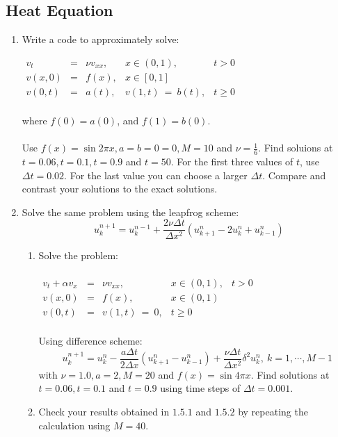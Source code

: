 \documentclass[12pt]{article}
\theoremstyle{definition}
\begin{document}
\subsection*{Heat Equation}
\noindent

\begin{enumerate}
\item Write a code to approximately solve:
\begin{center}$\begin{array}{ccccccc}
v_t&=&\nu v_{xx}, & x\in(0,1), & t>0\\
v(x,0)&=&f(x), & x\in[0,1]\\
v(0,t)&=&a(t), &v(1,t)\ =\ b(t), &t\geq0\\
\end{array}$\end{center}
where $f(0)=a(0)$, and $f(1)=b(0)$. \\ \\Use $f(x)=\sin{2\pi x}, a = b = 0=0, M =10$ and $\nu=\frac{1}{6}$. Find soluions at $t=0.06, t=0.1, t=0.9$ and $t=50$. For the first three values of $t$, use $\Delta t =0.02$. For the last value you can choose a larger $\Delta t$. Compare and contrast your solutions to the exact solutions.

\item Solve the same problem using the leapfrog scheme:\\
\[u_k^{n+1} = u_k^{n-1}+\frac{2\nu\Delta t}{\Delta x^2}(u_{k+1}^n - 2u_k^n+u_{k-1}^n)\]

\begin{enumerate}
\item Solve the problem:
\begin{center}$\begin{array}{cccccc}\\
v_t+\alpha v_x&=&\nu v_{xx}, & x\in(0,1), & t>0\\
v(x,0)&=&f(x), &x\in(0,1)\\
v(0,t)&=&v(1,t) \ = \ 0, & t\geq0\\
\end{array}$\end{center}
Using difference scheme: \[u_k^{n+1} = u_k^n-\frac{a\Delta t}{2\Delta x}(u_{k+1}^n - u_{k-1}^n)+\frac{\nu\Delta t}{\Delta x^2}\delta^2u_k^n, \ k=1,\cdots,M-1\]
with $\nu=1.0, a=2, M=20$ and $f(x)=\sin{4\pi x}$. Find solutions at $t=0.06, t=0.1$ and $t=0.9$ using time steps of $\Delta t=0.001$.

\item Check your results obtained in $1.5.1$ and $1.5.2$ by repeating the calculation using $M=40$.\\


\end{enumerate}
\end{enumerate}
\end{document}

